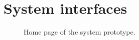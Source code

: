 \chapter{System interfaces}\label{appendixd}

\begin{figure}[ht!]
   \captionsetup{font=footnotesize}
   \centering
   \hspace{0.01\linewidth}
   \caption{Home page of the system prototype.
   }
   \label{fig:home} 
\end{figure}

